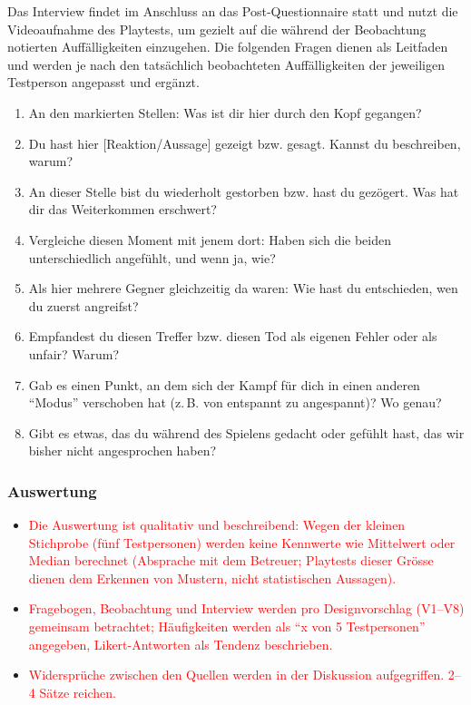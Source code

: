 \documentclass[../Main.tex]{subfiles}
\begin{document}
Das Interview findet im Anschluss an das Post-Questionnaire statt und nutzt die Videoaufnahme des Playtests, um gezielt auf die während der Beobachtung notierten Auffälligkeiten einzugehen. Die folgenden Fragen dienen als Leitfaden und werden je nach den tatsächlich beobachteten Auffälligkeiten der jeweiligen Testperson angepasst und ergänzt.
 
\begin{enumerate}[label=\textbf{I\arabic*}, leftmargin=1.5cm, itemsep=0.5em]
    \item An den markierten Stellen: Was ist dir hier durch den Kopf gegangen?
    \item Du hast hier [Reaktion/Aussage] gezeigt bzw. gesagt. Kannst du beschreiben, warum?
    \item An dieser Stelle bist du wiederholt gestorben bzw. hast du gezögert. Was hat dir das Weiterkommen erschwert?
    \item Vergleiche diesen Moment mit jenem dort: Haben sich die beiden unterschiedlich angefühlt, und wenn ja, wie?
    \item Als hier mehrere Gegner gleichzeitig da waren: Wie hast du entschieden, wen du zuerst angreifst?
    \item Empfandest du diesen Treffer bzw. diesen Tod als eigenen Fehler oder als unfair? Warum?
    \item Gab es einen Punkt, an dem sich der Kampf für dich in einen anderen \enquote{Modus} verschoben hat (z.\,B. von entspannt zu angespannt)? Wo genau?
    \item Gibt es etwas, das du während des Spielens gedacht oder gefühlt hast, das wir bisher nicht angesprochen haben?
\end{enumerate}

\subsubsection{Auswertung} \label{sec:Auswertung}

\begin{itemize}[leftmargin=1.5cm]
    \item \textcolor{red}{Die Auswertung ist qualitativ und beschreibend: Wegen der kleinen Stichprobe (fünf Testpersonen) werden keine Kennwerte wie Mittelwert oder Median berechnet (Absprache mit dem Betreuer; Playtests dieser Grösse dienen dem Erkennen von Mustern, nicht statistischen Aussagen).}
    \item \textcolor{red}{Fragebogen, Beobachtung und Interview werden pro Designvorschlag (V1--V8) gemeinsam betrachtet; Häufigkeiten werden als \enquote{x von 5 Testpersonen} angegeben, Likert-Antworten als Tendenz beschrieben.}
    \item \textcolor{red}{Widersprüche zwischen den Quellen werden in der Diskussion aufgegriffen. 2--4 Sätze reichen.}
\end{itemize}
\end{document}
